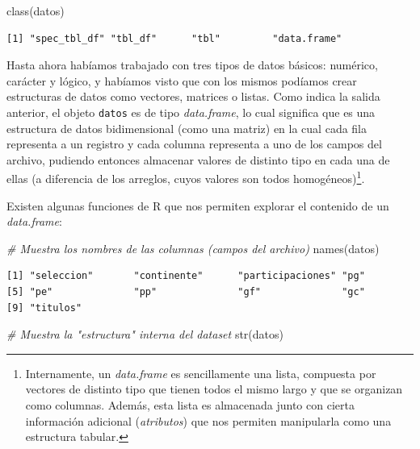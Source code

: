 \documentclass[
]{book}
\newenvironment{Shaded}{\begin{snugshade}}{\end{snugshade}}
\newcommand{\CommentTok}[1]{\textcolor[rgb]{0.56,0.35,0.01}{\textit{#1}}}
\newcommand{\FunctionTok}[1]{\textcolor[rgb]{0.00,0.00,0.00}{#1}}
\newcommand{\NormalTok}[1]{#1}
\begin{document}
\begin{Shaded}
\begin{Highlighting}[]
\FunctionTok{class}\NormalTok{(datos)}
\end{Highlighting}
\end{Shaded}

\begin{verbatim}
[1] "spec_tbl_df" "tbl_df"      "tbl"         "data.frame" 
\end{verbatim}

Hasta ahora habíamos trabajado con tres tipos de datos básicos: numérico, carácter y lógico, y habíamos visto que con los mismos podíamos crear estructuras de datos como vectores, matrices o listas. Como indica la salida anterior, el objeto \texttt{datos} es de tipo \emph{data.frame}, lo cual significa que es una estructura de datos bidimensional (como una matriz) en la cual cada fila representa a un registro y cada columna representa a uno de los campos del archivo, pudiendo entonces almacenar valores de distinto tipo en cada una de ellas (a diferencia de los arreglos, cuyos valores son todos homogéneos)\footnote{Internamente, un \emph{data.frame} es sencillamente una lista, compuesta por vectores de distinto tipo que tienen todos el mismo largo y que se organizan como columnas. Además, esta lista es almacenada junto con cierta información adicional (\emph{atributos}) que nos permiten manipularla como una estructura tabular.}.

Existen algunas funciones de R que nos permiten explorar el contenido de un \emph{data.frame}:

\begin{Shaded}
\begin{Highlighting}[]
\CommentTok{\# Muestra los nombres de las columnas (campos del archivo)}
\FunctionTok{names}\NormalTok{(datos)}
\end{Highlighting}
\end{Shaded}

\begin{verbatim}
[1] "seleccion"       "continente"      "participaciones" "pg"             
[5] "pe"              "pp"              "gf"              "gc"             
[9] "titulos"        
\end{verbatim}

\begin{Shaded}
\begin{Highlighting}[]
\CommentTok{\# Muestra la "estructura" interna del dataset}
\FunctionTok{str}\NormalTok{(datos)}
\end{Highlighting}
\end{Shaded}
\end{document}
